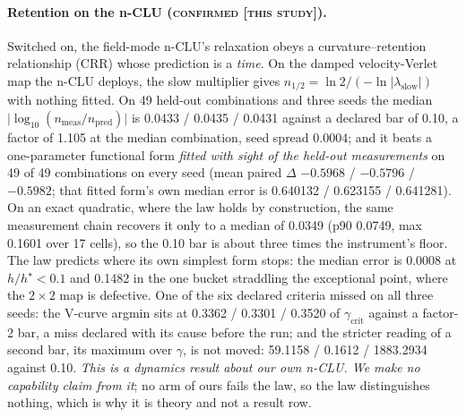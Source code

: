 \documentclass{article} %
\begin{document}
\paragraph{Retention on the n-CLU (\textsc{confirmed [this study]}).} Switched on, the field-mode
n-CLU's relaxation obeys a curvature--retention relationship (CRR) whose prediction is a
\emph{time}. On the damped velocity-Verlet map the n-CLU deploys, the slow
multiplier gives $n_{1/2}=\ln2/(-\ln\lvert\lambda_{\text{slow}}\rvert)$ with nothing fitted. On 49
held-out combinations and three seeds the median $\lvert\log_{10}(n_{\text{meas}}/n_{\text{pred}})\rvert$ is
0.0433 / 0.0435 / 0.0431 against a declared bar of 0.10, a factor of 1.105 at the median
combination, seed spread 0.0004; and it beats a one-parameter functional form \emph{fitted with sight
of the held-out measurements} on 49 of 49 combinations on every seed (mean paired $\Delta$ $-0.5968$ /
$-0.5796$ / $-0.5982$; that fitted form's own median error is 0.640132 / 0.623155 / 0.641281).
On an exact quadratic, where the law holds by construction, the same measurement chain recovers it
only to a median of 0.0349 (p90 0.0749, max 0.1601 over 17 cells), so the 0.10 bar is about three
times the instrument's floor. %
The law predicts where its own simplest form stops: the median error is 0.0008 at $h/h^\star<0.1$
and 0.1482 in the one bucket straddling the exceptional point, where the $2\times2$ map is
defective. %
One of the six declared criteria missed on all three seeds: the V-curve argmin sits at 0.3362 /
0.3301 / 0.3520 of $\gamma_{\text{crit}}$ against a factor-2 bar, a miss declared with its
cause before the run; and the stricter reading of a second bar, its maximum over $\gamma$, is
not moved: 59.1158 / 0.1612 / 1883.2934 against 0.10.
\emph{This is a dynamics result about our own n-CLU. We make no capability claim from it}; no arm of ours fails the law, so the law
distinguishes nothing, which is why it is theory and not a result row.
\end{document}

